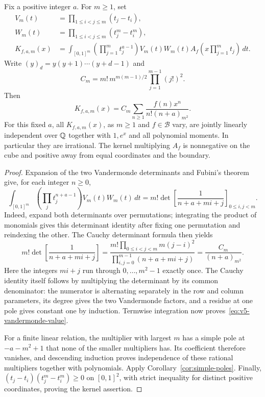 \begin{theorem}
\label{thm:v5-vandermonde-integrals}
Fix a positive integer $a$.  For $m\geq1$, set
\begin{align*}
 V_m(t)&=\prod_{1\leq i<j\leq m}(t_j-t_i),\\
 W_m(t)&=\prod_{1\leq i<j\leq m}(t_j^m-t_i^m),\\
 K_{f,a,m}(x)&=\int_{[0,1]^m}
  \left(\prod_{j=1}^m t_j^{a-1}\right)V_m(t)W_m(t)
  A_f\!\left(x\prod_{j=1}^m t_j\right)\,dt.
\end{align*}
Write $(y)_d=y(y+1)\cdots(y+d-1)$ and
\[
 C_m=m!\,m^{m(m-1)/2}\prod_{j=1}^{m-1}(j!)^2.
\]
Then
\begin{equation}
 K_{f,a,m}(x)=C_m\sum_{n\geq1}
          \frac{f(n)x^n}{n!(n+a)_{m^2}}.
 \label{eq:v5-vandermonde-value}
\end{equation}
For this fixed $a$, all $K_{f,a,m}(x)$, as $m\geq1$ and
$f\in\mathcal B$ vary, are jointly linearly independent over $\mathbb Q$
together with $1,e^x$ and all polynomial moments.  In particular they
are irrational.  The kernel multiplying $A_f$ is nonnegative on the
cube and positive away from equal coordinates and the boundary.
\end{theorem}
\begin{proof}
Expansion of the two Vandermonde determinants and Fubini's theorem
give, for each integer $n\geq0$,
\[
 \int_{[0,1]^m}\left(\prod_jt_j^{n+a-1}\right)V_m(t)W_m(t)\,dt
 =m!\det\left[\frac1{n+a+mi+j}\right]_{0\leq i,j<m}.
\]
Indeed, expand both determinants over permutations; integrating the
product of monomials gives this determinant identity after fixing one
permutation and reindexing the other.  The Cauchy determinant formula
then yields
\[
 m!\det\left[\frac1{n+a+mi+j}\right]
 =\frac{m!\prod_{0\leq i<j<m}m(j-i)^2}
        {\prod_{i,j=0}^{m-1}(n+a+mi+j)}
 =\frac{C_m}{(n+a)_{m^2}}.
\]
Here the integers $mi+j$ run through $0,\ldots,m^2-1$ exactly once.
The Cauchy identity itself follows by multiplying the determinant by
its common denominator: the numerator is alternating separately in
the row and column parameters, its degree gives the two Vandermonde
factors, and a residue at one pole gives constant one by induction.
Termwise integration now proves~\eqref{eq:v5-vandermonde-value}.

For a finite linear relation, the multiplier with largest $m$ has a
simple pole at $-a-m^2+1$ that none of the smaller multipliers has.
Its coefficient therefore vanishes, and descending induction proves
independence of these rational multipliers together with polynomials.
Apply Corollary~\ref{cor:simple-poles}.  Finally,
$(t_j-t_i)(t_j^m-t_i^m)\geq0$ on $[0,1]^2$, with strict inequality
for distinct positive coordinates, proving the kernel assertion.
\end{proof}


